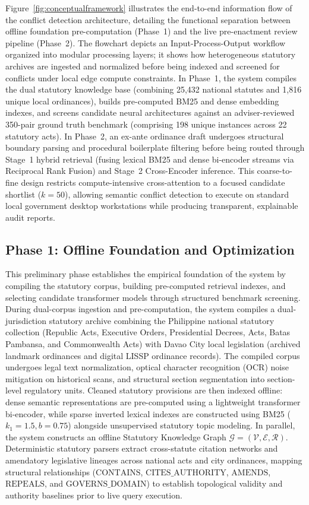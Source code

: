     Figure~\ref{fig:conceptualframework} illustrates the end-to-end information flow of the conflict detection architecture, detailing the functional separation between offline foundation pre-computation (Phase~1) and the live pre-enactment review pipeline (Phase~2). The flowchart depicts an Input-Process-Output workflow organized into modular processing layers; it shows how heterogeneous statutory archives are ingested and normalized before being indexed and screened for conflicts under local edge compute constraints. In Phase~1, the system compiles the dual statutory knowledge base (combining 25,432 national statutes and 1,816 unique local ordinances), builds pre-computed BM25 and dense embedding indexes, and screens candidate neural architectures against an adviser-reviewed 350-pair ground truth benchmark (comprising 198 unique instances across 22 statutory acts). In Phase~2, an ex-ante ordinance draft undergoes structural boundary parsing and procedural boilerplate filtering before being routed through Stage~1 hybrid retrieval (fusing lexical BM25 and dense bi-encoder streams via Reciprocal Rank Fusion) and Stage~2 Cross-Encoder inference. This coarse-to-fine design restricts compute-intensive cross-attention to a focused candidate shortlist ($k=50$), allowing semantic conflict detection to execute on standard local government desktop workstations while producing transparent, explainable audit reports.

    \subsection{Phase 1: Offline Foundation and Optimization}
    This preliminary phase establishes the empirical foundation of the system by compiling the statutory corpus, building pre-computed retrieval indexes, and selecting candidate transformer models through structured benchmark screening. During dual-corpus ingestion and pre-computation, the system compiles a dual-jurisdiction statutory archive combining the Philippine national statutory collection (Republic Acts, Executive Orders, Presidential Decrees, Acts, Batas Pambansa, and Commonwealth Acts) with Davao City local legislation (archived landmark ordinances and digital LISSP ordinance records). The compiled corpus undergoes legal text normalization, optical character recognition (OCR) noise mitigation on historical scans, and structural section segmentation into section-level regulatory units. Cleaned statutory provisions are then indexed offline: dense semantic representations are pre-computed using a lightweight transformer bi-encoder, while sparse inverted lexical indexes are constructed using BM25 ($k_1 = 1.5, b = 0.75$) alongside unsupervised statutory topic modeling. In parallel, the system constructs an offline Statutory Knowledge Graph $\mathcal{G} = (\mathcal{V}, \mathcal{E}, \mathcal{R})$. Deterministic statutory parsers extract cross-statute citation networks and amendatory legislative lineages across national acts and city ordinances, mapping structural relationships ($\text{CONTAINS}$, $\text{CITES\_AUTHORITY}$, $\text{AMENDS}$, $\text{REPEALS}$, and $\text{GOVERNS\_DOMAIN}$) to establish topological validity and authority baselines prior to live query execution.


